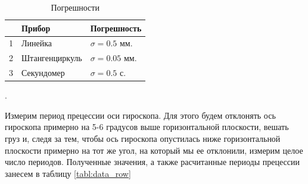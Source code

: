 \documentclass[a4paper, 12pt]{article}
\newcounter{Points}
\newcommand{\point}{\arabic{Points}. \addtocounter{Points}{1}}
\begin{document}
\begin{table}[H]
    \centering
    \begin{tabular}{|l|l|l|}
    \hline 
           & Прибор         & Погрешность          \\ \hline
    1      & Линейка        & $\sigma = 0.5 $ мм.  \\ \hline
    2      & Штангенциркуль & $\sigma = 0.05$ мм.  \\ \hline
    3      & Секундомер     & $\sigma = 0.5 $ с.    \\ \hline
    \end{tabular}
	\caption{Погрешности}
    \label{tabl:inaccs}
\end{table}

\point Измерим период прецессии оси гироскопа. Для этого будем отклонять ось гироскопа примерно на 5-6 градусов выше горизонтальной плоскости, вешать груз и, следя за тем, чтобы ось гироскопа опустилась ниже горизонтальной плоскости примерно на тот же угол, на который мы ее отклонили, измерим целое число периодов. Полученные значения, а также расчитанные периоды прецессии занесем в таблицу \ref{tabl:data_row}
\end{document}
